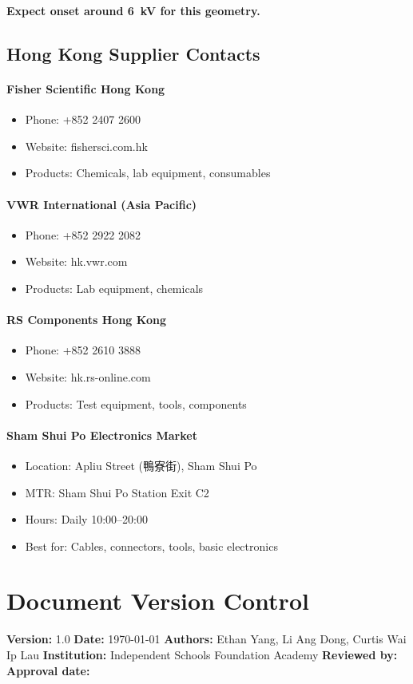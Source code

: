 \documentclass[11pt]{article}
\begin{document}
\textbf{Expect onset around 6~kV for this geometry.}

\subsection{Hong Kong Supplier Contacts}

\paragraph{Fisher Scientific Hong Kong}
\begin{itemize}
\item Phone: +852 2407 2600
\item Website: fishersci.com.hk
\item Products: Chemicals, lab equipment, consumables
\end{itemize}

\paragraph{VWR International (Asia Pacific)}
\begin{itemize}
\item Phone: +852 2922 2082
\item Website: hk.vwr.com
\item Products: Lab equipment, chemicals
\end{itemize}

\paragraph{RS Components Hong Kong}
\begin{itemize}
\item Phone: +852 2610 3888
\item Website: hk.rs-online.com
\item Products: Test equipment, tools, components
\end{itemize}

\paragraph{Sham Shui Po Electronics Market}
\begin{itemize}
\item Location: Apliu Street (鴨寮街), Sham Shui Po
\item MTR: Sham Shui Po Station Exit C2
\item Hours: Daily 10:00--20:00
\item Best for: Cables, connectors, tools, basic electronics
\end{itemize}

\section{Document Version Control}

\textbf{Version:} 1.0  
\textbf{Date:} \today  
\textbf{Authors:} Ethan Yang, Li Ang Dong, Curtis Wai Ip Lau  
\textbf{Institution:} Independent Schools Foundation Academy  
\textbf{Reviewed by:} \underline{\hspace{5cm}}  
\textbf{Approval date:} \underline{\hspace{3cm}}
\end{document}
